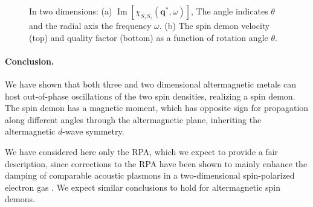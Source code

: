 \documentclass[aps,prl,reprint,twocolumns,superscriptaddress]{revtex4-2}
\DeclareMathOperator{\Imm}{Im}
\newcommand{\pg}[1]{\textcolor{red}{PG: #1}}
\begin{document}
	\begin{figure}
		\caption{In two dimensions: (a) $\Imm[\chi_{S_zS_z}(\bm q^*,\omega)]$, The angle indicates $\theta$ and the radial axis the frequency $\omega$. (b) The spin demon velocity (top) and quality factor (bottom) as a function of rotation angle  $\theta$. \label{fig:2D} }
	\end{figure}
	
	
	
	\paragraph{Conclusion. }We have shown that both three and two dimensional altermagnetic metals can host out-of-phase oscillations of the two spin densities, realizing a spin demon. The spin demon has a magnetic moment, which has opposite sign for propagation along different angles through the altermagnetic plane, inheriting the altermagnetic $d$-wave symmetry.
	
	We have considered here only the RPA, which we expect to provide a fair description, since corrections to the RPA have been shown to mainly enhance the damping of comparable acoustic plasmons in a two-dimensional spin-polarized electron gas \cite{kreilExcitationsSpinpolarizedTwodimensional2015}. We  expect similar conclusions to hold for altermagnetic spin demons.
	
\end{document}
